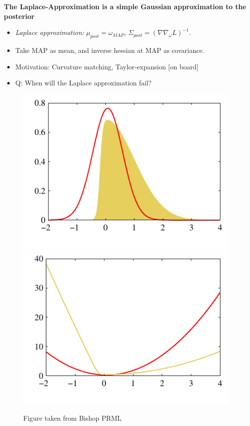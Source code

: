 \textbf{The Laplace-Approximation is a simple Gaussian approximation to the posterior}
\begin{itemize}
\item \emph{Laplace approximation:} $\mu_{post}=\omega_{MAP}$, $\Sigma_{post}=\left(\nabla \nabla_\omega L   \right)^{-1}$. 
\item Take MAP as mean, and inverse hessian at MAP as covariance.
\item  Motivation: Curvature matching, Taylor-expansion [on board]
\item  Q: When will the Laplace approximation fail?
\end{itemize}
\begin{figure}
\includegraphics[width=.49\textwidth]{./lecture7/Figure414a.pdf}
\includegraphics[width=.49\textwidth]{./lecture7/Figure414b.pdf}
\caption{Figure taken from Bishop PRML}
\end{figure}



